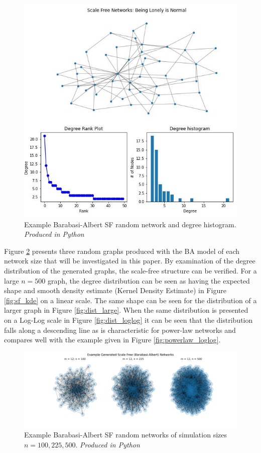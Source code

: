 \documentclass[
	a4paper, %
	10pt, %
	unnumberedsections, %
	twoside, %
]{LTJournalArticle}
\begin{document}
\begin{figure} %
	\includegraphics[width=\linewidth]{Figures/ba/sf_poster.jpg}
	\caption{Example Barabasi-Albert SF random network and degree histogram. \emph{Produced in Python}}
	\label{fig:sf_poster}
\end{figure}

Figure \ref{fig:example_sizes} presents three random graphs produced with the BA model of each network size that will be investigated in this paper. By examination of the degree distribution of the generated graphs, the scale-free structure can be verified. For a large \(n = 500\) graph, the degree distribution can be seen as having the expected shape and smooth density estimate (Kernel Density Estimate) in Figure \ref{fig:sf_kde} on a linear scale. The same shape can be seen for the distribution of a larger graph in Figure \ref{fig:dist_large}. When the same distribution is presented on a Log-Log scale in Figure \ref{fig:dist_loglog} it can be seen that the distribution falls along a descending line as is characteristic for power-law networks and compares well with the example given in Figure \ref{fig:powerlaw_loglog}. 

\begin{figure} %
	\includegraphics[width=\linewidth]{Figures/ba/example_sizes.jpg}
	\caption{Example Barabasi-Albert SF random networks of simulation sizes \(n = 100, 225, 500\). \emph{Produced in Python}}
	\label{fig:example_sizes}
\end{figure}
\end{document}
